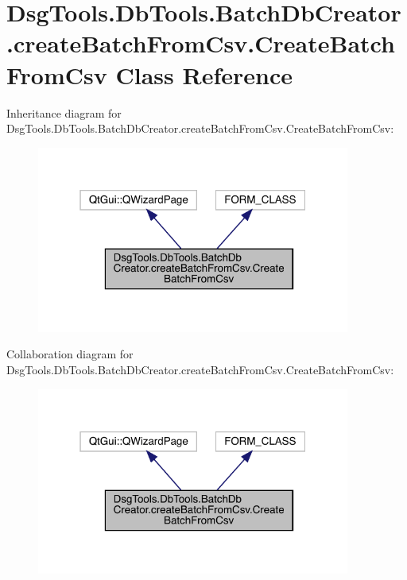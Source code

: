 \hypertarget{class_dsg_tools_1_1_db_tools_1_1_batch_db_creator_1_1create_batch_from_csv_1_1_create_batch_from_csv}{}\section{Dsg\+Tools.\+Db\+Tools.\+Batch\+Db\+Creator.\+create\+Batch\+From\+Csv.\+Create\+Batch\+From\+Csv Class Reference}
\label{class_dsg_tools_1_1_db_tools_1_1_batch_db_creator_1_1create_batch_from_csv_1_1_create_batch_from_csv}


Inheritance diagram for Dsg\+Tools.\+Db\+Tools.\+Batch\+Db\+Creator.\+create\+Batch\+From\+Csv.\+Create\+Batch\+From\+Csv\+:
\nopagebreak
\begin{figure}[H]
\begin{center}
\leavevmode
\includegraphics[width=292pt]{class_dsg_tools_1_1_db_tools_1_1_batch_db_creator_1_1create_batch_from_csv_1_1_create_batch_from_csv__inherit__graph}
\end{center}
\end{figure}


Collaboration diagram for Dsg\+Tools.\+Db\+Tools.\+Batch\+Db\+Creator.\+create\+Batch\+From\+Csv.\+Create\+Batch\+From\+Csv\+:
\nopagebreak
\begin{figure}[H]
\begin{center}
\leavevmode
\includegraphics[width=292pt]{class_dsg_tools_1_1_db_tools_1_1_batch_db_creator_1_1create_batch_from_csv_1_1_create_batch_from_csv__coll__graph}
\end{center}
\end{figure}
